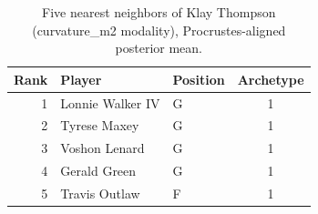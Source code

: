 \begin{table}[htbp]
  \centering\small
  \begin{tabular}{rllc}
    \toprule
    Rank & Player & Position & Archetype \\
    \midrule
    1 & Lonnie Walker IV & G & 1 \\
    2 & Tyrese Maxey & G & 1 \\
    3 & Voshon Lenard & G & 1 \\
    4 & Gerald Green & G & 1 \\
    5 & Travis Outlaw & F & 1 \\
    \bottomrule
  \end{tabular}
  \caption{Five nearest neighbors of Klay Thompson (curvature_m2 modality), Procrustes-aligned posterior mean.}
  \label{tab:Klay_Thompson_neighbors_curvature_m2}
\end{table}


